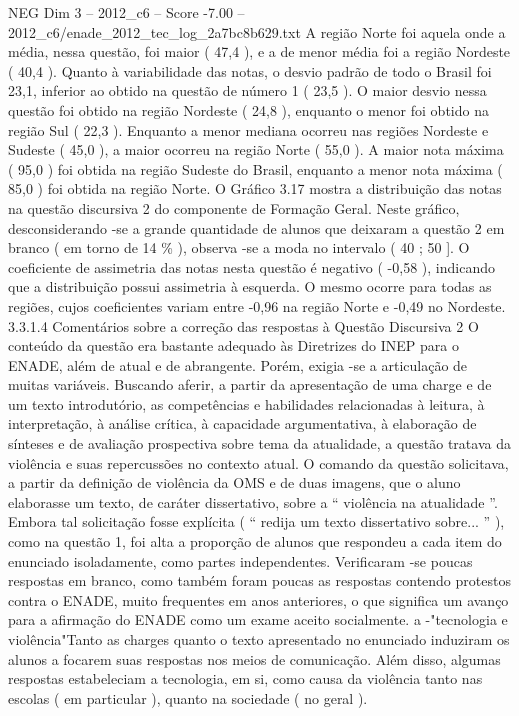 \begin{textsample}{NEG Dim 3 – 2012\_c6 – Score -7.00 – 2012\_c6/enade\_2012\_tec\_log\_2a7bc8b629.txt}
A região Norte foi aquela onde a média, nessa questão, foi maior ( 47,4 ), e a de menor média foi a região Nordeste ( 40,4 ).
Quanto à variabilidade das notas, o desvio padrão de todo o Brasil foi 23,1, inferior ao obtido na questão de número 1 ( 23,5 ).
O maior desvio nessa questão foi obtido na região Nordeste ( 24,8 ), enquanto o menor foi obtido na região Sul ( 22,3 ).
Enquanto a menor mediana ocorreu nas regiões Nordeste e Sudeste ( 45,0 ), a maior ocorreu na região Norte ( 55,0 ).
A maior nota máxima ( 95,0 ) foi obtida na região Sudeste do Brasil, enquanto a menor nota máxima ( 85,0 ) foi obtida na região Norte.
O Gráfico 3.17 mostra a distribuição das notas na questão discursiva 2 do componente de Formação Geral.
Neste gráfico, desconsiderando -se a grande quantidade de alunos que deixaram a questão 2 em branco ( em torno de 14 \% ), observa -se a moda no intervalo ( 40 ; 50 ].
O coeficiente de assimetria das notas nesta questão é negativo ( -0,58 ), indicando que a distribuição possui assimetria à esquerda.
O mesmo ocorre para todas as regiões, cujos coeficientes variam entre -0,96 na região Norte e -0,49 no Nordeste. 3.3.1.4 Comentários sobre a correção das respostas à Questão Discursiva 2 O conteúdo da questão era bastante adequado às Diretrizes do INEP para o ENADE, além de atual e de abrangente.
Porém, exigia -se a articulação de muitas variáveis.
Buscando aferir, a partir da apresentação de uma charge e de um texto introdutório, as competências e habilidades relacionadas à leitura, à interpretação, à análise crítica, à capacidade argumentativa, à elaboração de sínteses e de avaliação prospectiva sobre tema da atualidade, a questão tratava da violência e suas repercussões no contexto atual.
O comando da questão solicitava, a partir da definição de violência da OMS e de duas imagens, que o aluno elaborasse um texto, de caráter dissertativo, sobre a “ violência na atualidade ”.
Embora tal solicitação fosse explícita ( “ redija um texto dissertativo sobre... ” ), como na questão 1, foi alta a proporção de alunos que respondeu a cada item do enunciado isoladamente, como partes independentes.
Verificaram -se poucas respostas em branco, como também foram poucas as respostas contendo protestos contra o ENADE, muito frequentes em anos anteriores, o que significa um avanço para a afirmação do ENADE como um exame aceito socialmente. a -"tecnologia e violência"Tanto as charges quanto o texto apresentado no enunciado induziram os alunos a focarem suas respostas nos meios de comunicação.
Além disso, algumas respostas estabeleciam a tecnologia, em si, como causa da violência tanto nas escolas ( em particular ), quanto na sociedade ( no geral ).

\end{textsample}
